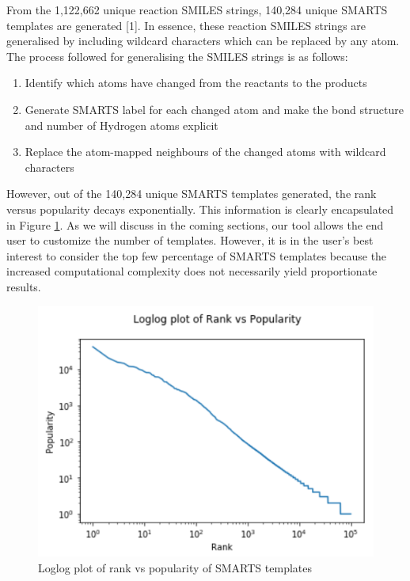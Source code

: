 \documentclass[preprint,12pt]{elsarticle}
\begin{document}
From the 1,122,662 unique reaction SMILES strings, 140,284 unique SMARTS templates are generated [1]. In essence, these reaction SMILES strings are generalised by including wildcard characters which can be replaced by any atom. The process followed for generalising the SMILES strings is as follows:

\begin{enumerate}
\item Identify which atoms have changed from the reactants to the products
\item Generate SMARTS label for each changed atom and make the bond structure and number of Hydrogen atoms explicit
\item Replace the atom-mapped neighbours of the changed atoms with wildcard characters
\end{enumerate}

However, out of the 140,284 unique SMARTS templates generated, the rank versus popularity decays exponentially. This information is clearly encapsulated in Figure \ref{fig:rank_vs_pop}. As we will discuss in the coming sections, our tool allows the end user to customize the number of templates. However, it is in the user's best interest to consider the top few percentage of SMARTS templates because the increased computational complexity does not necessarily yield proportionate results.

\begin{figure}[h]
\centering\includegraphics[width=0.6\linewidth]{rank_vs_popularity.png}
\caption{Loglog plot of rank vs popularity of SMARTS templates}
\label{fig:rank_vs_pop}
\end{figure}
\end{document}
